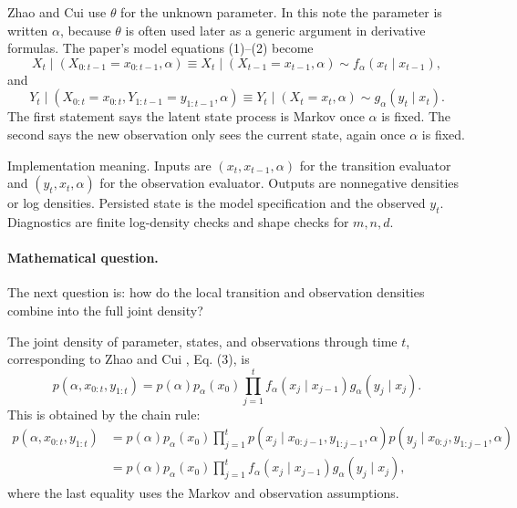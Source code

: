 \documentclass[11pt]{article}
\numberwithin{equation}{section}
\begin{document}
Zhao and Cui \cite{zhao2024ttsequential} use \(\theta\) for the unknown parameter.  In this note the parameter
is written \(\alpha\), because \(\theta\) is often used later as a generic
argument in derivative formulas.  The paper's model equations (1)--(2) become
\begin{equation}
    X_t\mid (X_{0:t-1}=x_{0:t-1},\alpha)
    \equiv
    X_t\mid (X_{t-1}=x_{t-1},\alpha)
    \sim f_\alpha(x_t\mid x_{t-1}),
    \label{eq:p24-bf-1}
\end{equation}
and
\begin{equation}
    Y_t\mid (X_{0:t}=x_{0:t},Y_{1:t-1}=y_{1:t-1},\alpha)
    \equiv
    Y_t\mid (X_t=x_t,\alpha)
    \sim g_\alpha(y_t\mid x_t).
    \label{eq:p24-bf-2}
\end{equation}
The first statement says the latent state process is Markov once \(\alpha\) is
fixed.  The second says the new observation only sees the current state, again
once \(\alpha\) is fixed.

Implementation meaning. Inputs are \((x_t,x_{t-1},\alpha)\)
for the transition evaluator and \((y_t,x_t,\alpha)\) for the observation
evaluator.  Outputs are nonnegative densities or log densities.  Persisted
state is the model specification and the observed \(y_t\).  Diagnostics are
finite log-density checks and shape checks for \(m,n,d\).

\paragraph{Mathematical question.}
The next question is: how do the local transition and observation densities
combine into the full joint density?

The joint density of parameter, states, and observations through time \(t\),
corresponding to Zhao and Cui \cite{zhao2024ttsequential}, Eq. (3), is
\begin{equation}
    p(\alpha,x_{0:t},y_{1:t})
    =
    p(\alpha)p_\alpha(x_0)
    \prod_{j=1}^{t}
    f_\alpha(x_j\mid x_{j-1})g_\alpha(y_j\mid x_j).
    \label{eq:p24-bf-3}
\end{equation}
This is obtained by the chain rule:
\[
\begin{aligned}
 p(\alpha,x_{0:t},y_{1:t})
 &=
 p(\alpha)p_\alpha(x_0)
 \prod_{j=1}^t
 p(x_j\mid x_{0:j-1},y_{1:j-1},\alpha)
 p(y_j\mid x_{0:j},y_{1:j-1},\alpha)\\
 &=
 p(\alpha)p_\alpha(x_0)
 \prod_{j=1}^t
 f_\alpha(x_j\mid x_{j-1})g_\alpha(y_j\mid x_j),
\end{aligned}
\]
where the last equality uses the Markov and observation assumptions.
\end{document}
